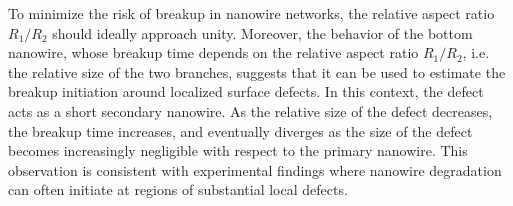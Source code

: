 To minimize the risk of breakup in nanowire networks, the relative aspect ratio $R_1/R_2$ should ideally approach unity. Moreover, the behavior of the bottom nanowire, whose breakup time depends on the relative aspect ratio $R_1/R_2$, i.e. the relative size of the two branches, suggests that it can be used to estimate the breakup initiation around localized surface defects. In this context, the defect acts as a short secondary nanowire. As the relative size of the defect decreases, the breakup time increases, and eventually diverges as the size of the defect becomes increasingly negligible with respect to the primary nanowire. This observation is consistent with experimental findings where nanowire degradation can often initiate at regions of substantial local defects.


